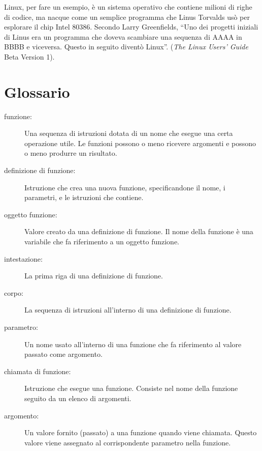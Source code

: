 \documentclass[10pt]{book}
\begin{document}
Linux, per fare un esempio, è un sistema operativo che contiene milioni di righe di codice, ma nacque come un semplice programma che Linus Torvalds usò per esplorare il chip Intel 80386. Secondo Larry Greenfields, ``Uno dei progetti iniziali di Linus era un programma che doveva scambiare una sequenza di AAAA in BBBB e viceversa. Questo in seguito diventò Linux''. ({\em The Linux Users' Guide} Beta Version 1).

\section{Glossario}

\begin{description}

\item[funzione:] Una sequenza di istruzioni dotata di un nome che esegue una certa operazione utile. Le funzioni possono o meno ricevere argomenti e possono o meno produrre un risultato.

\item[definizione di funzione:]  Istruzione che crea una nuova funzione, specificandone il nome, i parametri, e le istruzioni che contiene.

\item[oggetto funzione:]  Valore creato da una definizione di funzione. Il nome della funzione è una variabile che fa riferimento a un oggetto funzione.

\item[intestazione:] La prima riga di una definizione di funzione.

\item[corpo:] La sequenza di istruzioni all'interno di una definizione di funzione.

\item[parametro:] Un nome usato all'interno di una funzione che fa riferimento al valore passato come argomento.

\item[chiamata di funzione:] Istruzione che esegue una funzione. Consiste nel nome della funzione seguito da un elenco di argomenti.

\item[argomento:]  Un valore fornito (passato) a una funzione quando viene chiamata. Questo valore viene assegnato al corrispondente parametro nella funzione.


\end{description}
\end{document}
